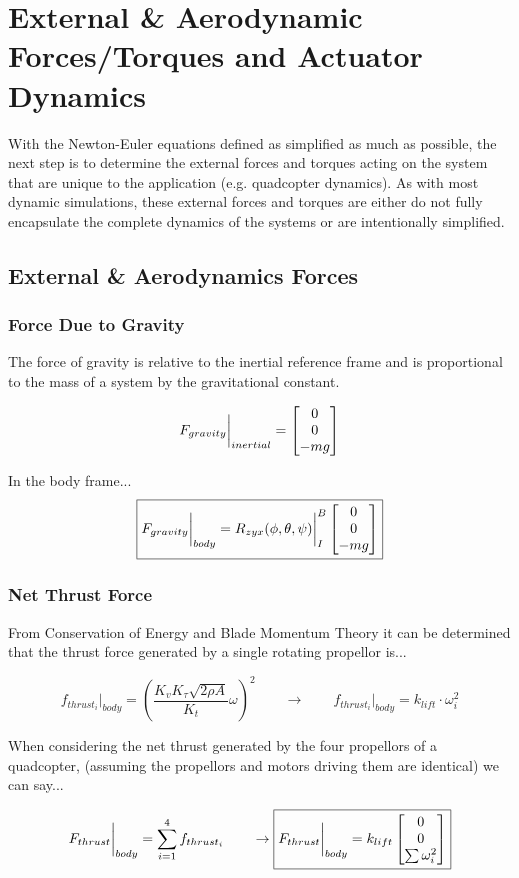 \newpage
\section{External \& Aerodynamic Forces/Torques and Actuator Dynamics}

With the Newton-Euler equations defined as simplified as much as possible, the next step is to determine the external forces and torques acting on the system that are unique to the application (e.g. quadcopter dynamics). As with most dynamic simulations, these external forces and torques are either do not fully encapsulate the complete dynamics of the systems or are intentionally simplified.

\subsection{External \& Aerodynamics Forces}

\subsubsection{Force Due to Gravity}
The force of gravity is relative to the inertial reference frame and is proportional to the mass of a system by the gravitational constant.

$$F_{gravity} \biggr\rvert_{inertial} = \begin{bmatrix} 0 \\ 0 \\ -mg \end{bmatrix} $$

In the body frame... 
$$\boxed{F_{gravity} \biggr\rvert_{body} = R_{zyx}(\phi, \theta, \psi)\biggr\rvert_{I}^{B}\begin{bmatrix} 0 \\ 0 \\ -mg \end{bmatrix}} $$


\subsubsection{Net Thrust Force}
From Conservation of Energy and Blade Momentum Theory it can be determined that the thrust force generated by a single rotating propellor is... 

$$f_{thrust_i}\biggr\rvert_{body} = \left( \frac{K_{v}K_{\tau}\sqrt{2\rho A}}{K_{t}}\omega \right)^{2}  \quad \quad \rightarrow \quad \quad f_{thrust_i}\biggr\rvert_{body} = k_{lift}\cdot\omega_{i}^{2}$$

When considering the net thrust generated by the four propellors of a quadcopter, (assuming the propellors and motors driving them are identical) we can say... 


$$F_{thrust}\biggr \rvert_{body} = \sum_{i=1}^{4} f_{thrust_i}\quad \quad \rightarrow \boxed{F_{thrust}\biggr \rvert_{body} = k_{lift}\begin{bmatrix} 0 \\ 0 \\ \sum\omega_{i}^{2} \end{bmatrix}}$$



